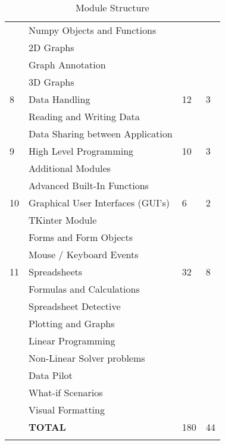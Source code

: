\begin{longtable}{|p{1.4cm}|p{8.4cm}|p{2.2cm}|p{1.8cm}|}
                & \qquad Numpy Objects and Functions         &    &    \\
                & \qquad 2D Graphs                           &    &    \\
                & \qquad Graph Annotation                    &    &    \\
                & \qquad 3D Graphs                           &    &    \\
             \hline
             8  & Data Handling                              &  12& 3  \\
                & \qquad Reading and Writing Data            &    &    \\
                & \qquad Data Sharing between Application    &    &    \\
             \hline
             9  & High Level Programming                     &  10& 3  \\
                & \qquad Additional Modules                  &    &    \\
                & \qquad Advanced Built-In Functions         &    &    \\
             \hline
             10 & Graphical User Interfaces (GUI's)          &  6 & 2  \\
                & \qquad TKinter Module                      &    &    \\
                & \qquad Forms and Form Objects              &    &    \\
                & \qquad Mouse / Keyboard Events             &    &    \\
             \hline
             11 & Spreadsheets                               & 32 & 8  \\
                & \qquad Formulas and Calculations           &    &    \\
                & \qquad Spreadsheet Detective               &    &    \\
                & \qquad Plotting and Graphs                 &    &    \\
                & \qquad Linear Programming                  &    &    \\
                & \qquad Non-Linear Solver problems          &    &    \\
                & \qquad Data Pilot                          &    &    \\
                & \qquad What-if Scenarios                   &    &    \\
                & \qquad Visual Formatting                   &    &    \\
             \hline
                & {\bf TOTAL}                                &180 &44  \\
             \hline

             \caption[Module Structure]{Module Structure} \label{tab:study_comp} \\
        \end{longtable}

